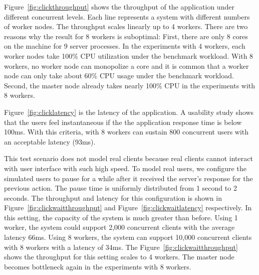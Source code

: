 Figure~\ref{fig:clickthroughput} shows the throughput of the application 
under different concurrent levels.
Each line represents a \cb{} system with different numbers of worker nodes.
The throughput scales linearly up to 4 workers.
There are two reasons why the result for 8 workers is suboptimal:
First, there are only 8 cores on the machine for 9 server processes.
In the experiments with 4 workers, each worker nodes take 100\% CPU utilization
under the benchmark workload.
With 8 workers, no worker node can monopolize a core and it is common that
a worker node can only take about 60\% CPU usage under the benchmark workload. 
Second, 
the master node already takes nearly 100\% CPU in the experiments with 8 workers.


\clicklatency{}

Figure~\ref{fig:clicklatency} is the latency of the application.
A usability study shows that the users feel instantaneous if the 
the application response time is below 100ms.
With this criteria,
\cb{} with 8 workers can sustain 800 concurrent users with an acceptable latency (93ms).

This test scenario does not model real clients because real clients cannot 
interact with user interface with such high speed.
To model real users, we configure the simulated users to pause for a while
after it received the server's response for the previous action.
The pause time is uniformly distributed from 1 second to 2 seconds.
The throughput and latency for this configuration is shown 
in Figure~\ref{fig:clickwaitthroughput} and Figure~\ref{fig:clickwaitlatency} respectively.
In this setting, the capacity of the system is much greater than before.
Using 1 worker, the system could support 2,000 concurrent clients with the average latency 66ms.
Using 8 workers, 
the system can support 10,000 concurrent clients with 8 workers with a latency of 34ms.
The Figure~\ref{fig:clickwaitthroughput} shows the throughput for this setting 
scales to 4 workers.
The master node becomes bottleneck again in the experiments with 8 workers.


\clickwaitthroughput{}
\clickwaitlatency{}

